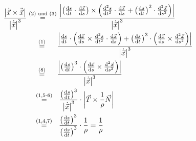 \documentclass{theozettel}
\begin{document}
	\begin{align*}
		\frac{\qty| \dot{\vec{x}} \times \ddot{\vec{x}} |}{\qty| \dot{\vec{x}} |^{3}} &\stackrel{\text{(2) und (3)}}{=} \frac{\qty| \qty( \dv{s}{t} \cdot \dv{\vec{x}}{s} ) \times \qty( \dv[2]{s}{t} \cdot \dv{\vec{x}}{s} + \qty( \dv{s}{t} )^{2} \cdot \dv[2]{\vec{x}}{s} )|}{\qty| \dot{\vec{x}} |^{3}} \\
		&\ \ \ \ \stackrel{\text{(1)}}{=}\ \ \ \ \frac{\qty| \dv{s}{t} \cdot \qty( \dv{\vec{x}}{s} \times \dv[2]{s}{t} \cdot \dv{\vec{x}}{s}) + \qty(\dv{s}{t})^{3} \cdot \qty( \dv{\vec{x}}{s} \times \dv[2]{\vec{x}}{s} ) |}{\qty| \dot{\vec{x}} |^{3}} \\
		&\ \ \ \ \stackrel{\text{(8)}}{=} \ \ \ \ \frac{\qty| \qty(\dv{s}{t})^{3} \cdot \qty( \dv{\vec{x}}{s} \times \dv[2]{\vec{x}}{s} ) |}{\qty| \dot{\vec{x}} |^{3}} \\
		&\ \ \ \stackrel{\text{(1,5-6)}}{=} \ \ \frac{\qty(\dv{s}{t})^{3}}{\qty| \dot{\vec{x}} |^{3}} \cdot \qty| \vec{T} \times \frac{1}{\rho} \vec{N}  | \\
		&\ \ \ \stackrel{\text{(1,4,7)}}{=} \ \ \frac{\qty(\dv{s}{t})^{3}}{\qty(\dv{s}{t})^{3}} \cdot \frac{1}{\rho} = \frac{1}{\rho}
	\end{align*}
\end{document}
